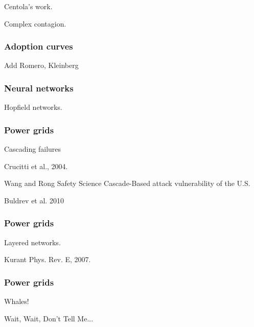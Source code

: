 \begin{frame}
  \frametitle{}

  Centola's work.

  Complex contagion.

\end{frame}

\begin{frame}
  \frametitle{Adoption curves}

  Add Romero, Kleinberg

\end{frame}

\begin{frame}
  \frametitle{Neural networks}

  Hopfield networks.

\end{frame}


\begin{frame}
  \frametitle{Power grids}

  Cascading failures

  Crucitti et al., 2004.

  Wang and Rong
  Safety Science
  Cascade-Based  attack vulnerability of the U.S.

  Buldrev et al. 2010

\end{frame}

\begin{frame}
  \frametitle{Power grids}

  Layered networks.

  Kurant
  Phys. Rev. E, 2007.

\end{frame}


\begin{frame}
  \frametitle{Power grids}

  Whales!

  Wait, Wait, Don't Tell Me...


\end{frame}
